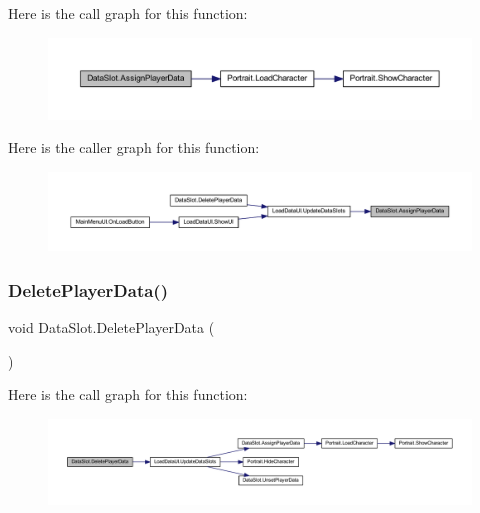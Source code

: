 Here is the call graph for this function\+:
\nopagebreak
\begin{figure}[H]
\begin{center}
\leavevmode
\includegraphics[width=350pt]{class_data_slot_a104284ff9c03da56e871e2f39d345e0b_cgraph}
\end{center}
\end{figure}
Here is the caller graph for this function\+:
\nopagebreak
\begin{figure}[H]
\begin{center}
\leavevmode
\includegraphics[width=350pt]{class_data_slot_a104284ff9c03da56e871e2f39d345e0b_icgraph}
\end{center}
\end{figure}
\mbox{\label{class_data_slot_aae68b8b9d2f07c2d634e82493d29c05d}} 
\subsubsection{\texorpdfstring{DeletePlayerData()}{DeletePlayerData()}}
{\footnotesize\ttfamily void Data\+Slot.\+Delete\+Player\+Data (\begin{DoxyParamCaption}{ }\end{DoxyParamCaption})}

Here is the call graph for this function\+:
\nopagebreak
\begin{figure}[H]
\begin{center}
\leavevmode
\includegraphics[width=350pt]{class_data_slot_aae68b8b9d2f07c2d634e82493d29c05d_cgraph}
\end{center}
\end{figure}
\mbox{\label{class_data_slot_a8c5e92e015138b1ec785465db9ff65a6}} 
